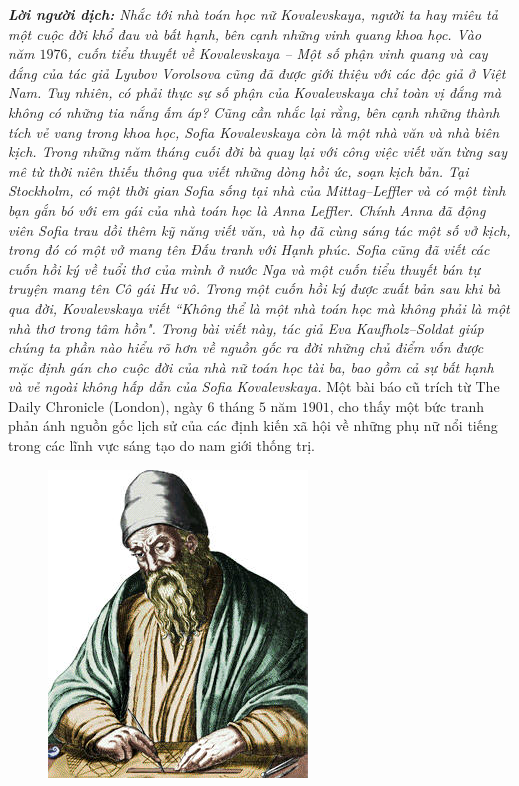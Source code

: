 \vspace*{183pt}

\begin{multicols}{2}
	\textit{\textbf{\color{lichsutoanhoc}Lời người dịch:} Nhắc tới nhà toán học nữ Kovalevskaya, người ta hay miêu tả một cuộc đời khổ đau và bất hạnh, bên cạnh những vinh quang khoa học. Vào năm $1976$, cuốn tiểu thuyết về Kovalevskaya -- Một số phận vinh quang và cay đắng của tác giả Lyubov Vorolsova cũng đã được giới thiệu với các độc giả ở Việt Nam. Tuy nhiên, có phải thực sự số phận của Kovalevskaya chỉ toàn vị đắng mà không có những tia nắng ấm áp? Cũng cần nhắc lại rằng, bên cạnh những thành tích vẻ vang trong khoa học, Sofia Kovalevskaya còn là một nhà văn và nhà biên kịch. Trong những năm tháng cuối đời bà quay lại với công việc viết văn từng say mê từ thời niên thiếu thông qua viết những dòng hồi ức, soạn kịch bản. Tại Stockholm, có một thời gian Sofia sống tại nhà của Mittag--Leffler và có một tình bạn gắn bó với em gái của nhà toán học là Anna Leffler. Chính Anna đã động viên Sofia trau dồi thêm kỹ năng viết văn, và họ đã cùng sáng tác một số vở kịch, trong đó có một vở mang tên Đấu tranh với Hạnh phúc. Sofia cũng đã viết các cuốn hồi ký về tuổi thơ của mình ở nước Nga và  một cuốn tiểu thuyết bán tự truyện mang tên Cô gái Hư vô.  Trong một cuốn hồi ký được xuất bản sau khi bà qua đời, Kovalevskaya viết ``Không thể là một nhà toán học mà không phải là một nhà thơ trong tâm hồn". Trong bài viết này, tác giả Eva Kaufholz--Soldat giúp chúng ta phần nào hiểu rõ hơn về nguồn gốc ra đời những chủ điểm vốn được mặc định gán cho cuộc đời của nhà nữ toán học tài ba, bao gồm cả sự bất hạnh và vẻ ngoài không hấp dẫn của Sofia Kovalevskaya.}
	\vskip 0.1cm
	Một bài báo cũ trích từ The Daily Chronicle (London), ngày $6$ tháng $5$ năm $1901$, cho thấy một bức tranh phản ánh nguồn gốc lịch sử của các định kiến xã hội về những phụ nữ nổi tiếng trong các lĩnh vực sáng tạo do nam giới thống trị. 
	\begin{figure}[H]
		\vspace*{-5pt}
		\centering
		\captionsetup{labelformat= empty, justification=centering}
		\includegraphics[width= 0.8\linewidth]{1}

\end{figure}
\end{multicols}
